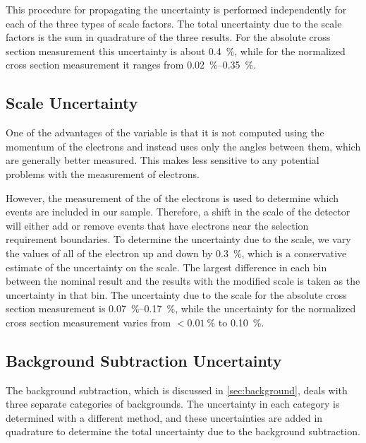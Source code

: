 This procedure for propagating the uncertainty is performed independently for
each of the three types of scale factors. The total uncertainty due to the
scale factors is the sum in quadrature of the three results. For the absolute
cross section measurement this uncertainty is about \SI{0.4}{\percent}, while
for the normalized cross section measurement it ranges from
\SIrange{0.02}{0.35}{\percent}.

\subsection{\texorpdfstring{\pt}{PT} Scale Uncertainty}
\label{ssec:pt_scale_uncertainty}

One of the advantages of the \phistar variable is that it is not computed using
the momentum of the electrons and instead uses only the angles between them,
which are generally better measured. This makes \phistar less sensitive to any
potential problems with the \pt measurement of electrons.

However, the measurement of the \pt of the electrons is used to determine which
events are included in our sample. Therefore, a shift in the \pt scale of the
detector will either add or remove events that have electrons near the \pt
selection requirement boundaries. To determine the uncertainty due to the \pt
scale, we vary the \pt values of all of the electron up and down by
\SI{0.3}{\percent}, which is a conservative estimate of the uncertainty on the
\pt scale. The largest difference in each \phistar bin between the nominal
result and the results with the modified \pt scale is taken as the uncertainty
in that bin. The uncertainty due to the \pt scale for the absolute cross
section measurement is \SIrange{0.07}{0.17}{\percent}, while the uncertainty
for the normalized cross section measurement varies from $<
\SI{0.01}{\percent}$ to \SI{0.10}{\percent}.

\subsection{Background Subtraction Uncertainty}
\label{ssec:background_subtraction_uncertainty}

The background subtraction, which is discussed in \cref{sec:background},
deals with three separate categories of backgrounds. The uncertainty in
each category is determined with a different method, and these uncertainties
are added in quadrature to determine the total uncertainty due to the
background subtraction.

